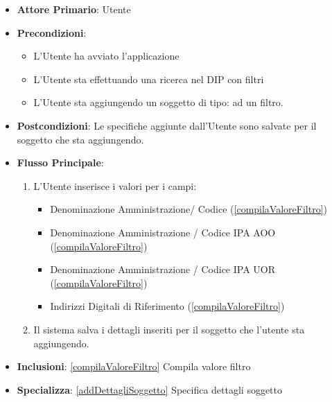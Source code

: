 \begin{itemize}
      \item \textbf{Attore Primario}: Utente
      \item \textbf{Precondizioni}: 
      \begin{itemize}
            \item L'Utente ha avviato l'applicazione
            \item L'Utente sta effettuando una ricerca nel DIP con filtri
            \item L'Utente sta aggiungendo un soggetto di tipo:  ad un filtro.
      \end{itemize}
      \item \textbf{Postcondizioni}:  Le specifiche aggiunte dall'Utente sono salvate per il soggetto che sta aggiungendo.
      \item \textbf{Flusso Principale}:
            \begin{enumerate}
                  \item L'Utente inserisce i valori per i campi:
                        \begin{itemize}
                              \item Denominazione Amministrazione/ Codice  (\ref{compilaValoreFiltro})
                              \item Denominazione Amministrazione / Codice IPA AOO (\ref{compilaValoreFiltro})
                              \item Denominazione Amministrazione / Codice IPA UOR (\ref{compilaValoreFiltro})
                              \item Indirizzi Digitali di Riferimento (\ref{compilaValoreFiltro})
                        \end{itemize}
                  \item Il sistema salva i dettagli inseriti per il soggetto che l'utente sta aggiungendo.
            \end{enumerate}
      \item \textbf{Inclusioni}: \ref{compilaValoreFiltro} Compila valore filtro
      \item \textbf{Specializza}: \ref{addDettagliSoggetto} Specifica dettagli soggetto
\end{itemize}


